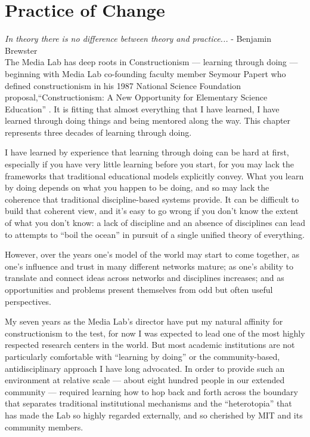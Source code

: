 \chapter{Practice of Change}
\label{chap:practice}

\textit{In theory there is no difference between theory and practice...} - Benjamin Brewster \cite{brewster1882} \\


The Media Lab has deep roots in Constructionism --- learning through doing --- beginning with Media Lab co-founding faculty member Seymour Papert who defined constructionism in his 1987 National Science Foundation proposal,``Constructionism: A New Opportunity for Elementary Science Education'' \cite{papert1986constructionism}. It is fitting that almost everything that I have learned, I have learned through doing things and being mentored along the way. This chapter represents three decades of learning through doing.

I have learned by experience that learning through doing can be hard at first, especially if you have very little learning before you start, for you may lack the frameworks that traditional educational models explicitly convey. What you learn by doing depends on what you happen to be doing, and so may lack the coherence that traditional discipline-based systems provide. It can be difficult to build that coherent view, and it's easy to go wrong if you don't know the extent of what you don't know: a lack of discipline and an absence of disciplines can lead to attempts to ``boil the ocean'' in pursuit of a single unified theory of everything.

However, over the years one's model of the world may start to come together, as one's influence and trust in many different networks mature; as one's ability to translate and connect ideas across networks and disciplines increases; and as opportunities and problems present themselves from odd but often useful perspectives.

My seven years as the Media Lab's director have put my natural affinity for constructionism to the test, for now I was expected to lead one of the most highly respected research centers in the world. But most academic institutions are not particularly comfortable with ``learning by doing'' or the community-based, antidisciplinary approach I have long advocated. In order to provide such an environment at relative scale --- about eight hundred people in our extended community --- required learning how to hop back and forth across the boundary that separates traditional institutional mechanisms and the ``heterotopia'' that has made the Lab so highly regarded externally, and so cherished by MIT and its community members. 

